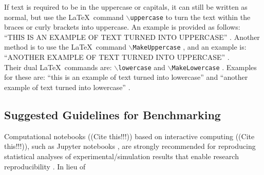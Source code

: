 \documentclass[letter,12pt]{article}
\begin{document}
If text is required to be in the uppercase or capitals, it can still be written as normal, but use the \LaTeX\ command {\tt $\backslash$uppercase} to turn the text within the braces or curly brackets into uppercase. An example is provided as follows: ``\uppercase{This is an Example of Text Turned into UpperCase}'' \cite[\S8.2.4, pp. 239]{Syropoulos2003}. Another method is to use the \LaTeX\ command {\tt $\backslash$MakeUppercase} \cite[\S Appendix G.1, pp. 512]{Kopka2004}, and an example is: ``\MakeUppercase{Another Example of Text Turned into UpperCase}'' \cite[\S6.8, pp. 47; \S23.2, pp. 212--213]{Greenwade2022} \cite[\S2.2.2, pp. 31; \S3.1.5, pp. 85--87; \S3.1.7, pp. 91; \S4.4.2, pp. 229; \S9.4.1, pp. 571]{Mittelbach2004} \cite[\S3.5, pp. 60]{Syropoulos2003} \cite[\S5, Changing Letter Case]{Ying20XY}. \\

Their dual \LaTeX\ commands are: {\tt $\backslash$lowercase} and {\tt $\backslash$MakeLowercase} \cite[\S Appendix G.1, pp. 512]{Kopka2004}. Examples for these are: ``\lowercase{This is an Example of Text Turned into LowerCase}'' \cite[\S8.2.4, pp. 239]{Syropoulos2003} and ``\MakeLowercase{Another Example of Text Turned into LowerCase}'' \cite[\S23.2, pp. 212--213]{Greenwade2022} \cite[\S2.2.6, pp. 37; \S3.1.5, pp. 85--87; \S7.3.1, pp. 341; \S9.4.1, pp. 571]{Mittelbach2004} \cite[\S3.5, pp. 60]{Syropoulos2003} \cite[\S5, Changing Letter Case]{Ying20XY}.





\subsection{Suggested Guidelines for Benchmarking}
\label{ssec:SuggestedGuidelinesForBenchmarking}


Computational notebooks ({\Huge (Cite this!!!)}) based on interactive computing ({\Huge (Cite this!!!)}), such as Jupyter notebooks , are strongly recommended for reproducing statistical analyses of experimental/simulation results that enable research reproducibility \cite{Schiermeier2018,Baumer2017,CodeOceanStaff2017,DatopianAtomaticLtdIncStaff2017,Kim2017,Mailund2017,Barba2016,Gandrud2015,Liberman2015,Creswell2014,Gandrud2014,Stodden2014,RunMyCodeAssociationContributors2013,Blackburn20XY,Geier20XY,Krishnamurthi20XY}. In lieu of 
\end{document}
